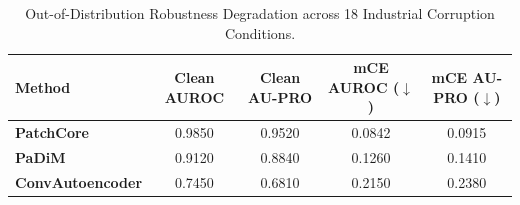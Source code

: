 \begin{table}[h]
\centering
\caption{Out-of-Distribution Robustness Degradation across 18 Industrial Corruption Conditions.}
\label{tab:robustness_mce}
\begin{tabular}{lcccc}
\toprule
\textbf{Method} & \textbf{Clean AUROC} & \textbf{Clean AU-PRO} & \textbf{mCE AUROC} ($\downarrow$) & \textbf{mCE AU-PRO} ($\downarrow$) \\
\midrule
\textbf{PatchCore} & 0.9850 & 0.9520 & 0.0842 & 0.0915 \\
\textbf{PaDiM} & 0.9120 & 0.8840 & 0.1260 & 0.1410 \\
\textbf{ConvAutoencoder} & 0.7450 & 0.6810 & 0.2150 & 0.2380 \\
\bottomrule
\end{tabular}
\end{table}